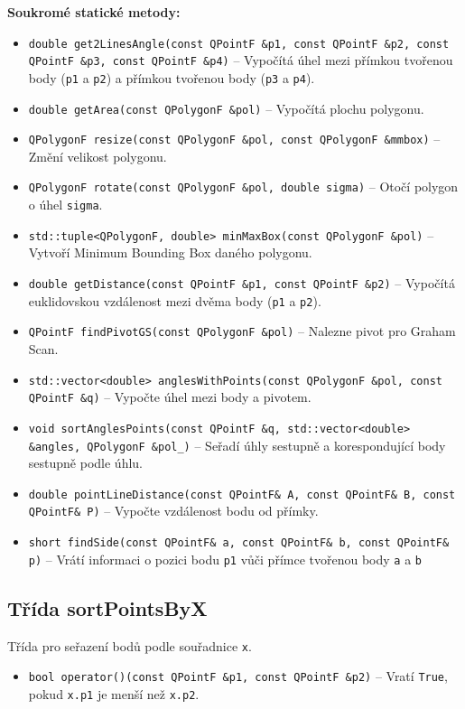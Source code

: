 \textbf{Soukromé statické metody:}
\begin{itemize}
\item \texttt{double get2LinesAngle(const QPointF \&p1, const QPointF \&p2, const QPointF \&p3, const QPointF \&p4)} – Vypočítá úhel mezi přímkou tvořenou body (\texttt{p1} a \texttt{p2}) a přímkou tvořenou body (\texttt{p3} a \texttt{p4}).
\item \texttt{double getArea(const QPolygonF \&pol)} – Vypočítá plochu polygonu.
\item \texttt{QPolygonF resize(const QPolygonF \&pol, const QPolygonF \&mmbox)} – Změní velikost polygonu.
\item \texttt{QPolygonF rotate(const QPolygonF \&pol, double sigma)} – Otočí polygon o úhel \texttt{sigma}.
\item \texttt{std::tuple<QPolygonF, double> minMaxBox(const QPolygonF \&pol)} – Vytvoří Minimum Bounding Box daného polygonu.
\item \texttt{double getDistance(const QPointF \&p1, const QPointF \&p2)} – Vypočítá euklidovskou vzdálenost mezi dvěma body (\texttt{p1} a \texttt{p2}).
\item \texttt{QPointF findPivotGS(const QPolygonF \&pol)} – Nalezne pivot pro Graham Scan.
\item \texttt{std::vector<double> anglesWithPoints(const QPolygonF \&pol, const QPointF \&q)} – Vypočte úhel mezi body a pivotem.
\item \texttt{void sortAnglesPoints(const QPointF \&q, std::vector<double> \&angles, QPolygonF \&pol\_)} – Seřadí úhly sestupně a korespondující body sestupně podle úhlu.
\item \texttt{double pointLineDistance(const QPointF\& A, const QPointF\& B, const QPointF\& P)} – Vypočte vzdálenost bodu od přímky.
\item \texttt{short findSide(const QPointF\& a, const QPointF\& b, const QPointF\& p)} – Vrátí informaci o pozici bodu \texttt{p1} vůči přímce tvořenou body \texttt{a} a \texttt{b}
\end{itemize}

\subsection{Třída sortPointsByX}
Třída pro seřazení bodů podle souřadnice \texttt{x}.
\begin{itemize}
    \item \texttt{bool  operator()(const QPointF \&p1, const QPointF \&p2)} – Vratí \texttt{True}, pokud \texttt{x.p1} je menší než \texttt{x.p2}.
\end{itemize}

